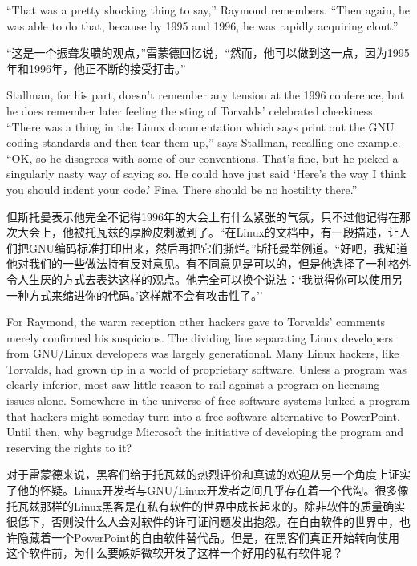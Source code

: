 \ifdefined\eng
``That was a pretty shocking thing to say,'' Raymond remembers. ``Then again, he was able to do that, because by 1995 and 1996, he was rapidly acquiring clout.''
\fi

\ifdefined\chs
``这是一个振聋发聩的观点，''雷蒙德回忆说，``然而，他可以做到这一点，因为1995年和1996年，他正不断的接受打击。''
\fi

\ifdefined\eng
Stallman, for his part, doesn't remember any tension at the 1996 conference, but he does remember later feeling the sting of Torvalds' celebrated cheekiness. ``There was a thing in the Linux documentation which says print out the GNU coding standards and then tear them up,'' says Stallman, recalling one example. ``OK, so he disagrees with some of our conventions. That's fine, but he picked a singularly nasty way of saying so. He could have just said `Here's the way I think you should indent your code.' Fine. There should be no hostility there.''
\fi

\ifdefined\chs
但斯托曼表示他完全不记得1996年的大会上有什么紧张的气氛，只不过他记得在那次大会上，他被托瓦兹的厚脸皮刺激到了。``在Linux的文档中，有一段描述，让人们把GNU编码标准打印出来，然后再把它们撕烂。''斯托曼举例道。``好吧，我知道他对我们的一些做法持有反对意见。有不同意见是可以的，但是他选择了一种格外令人生厌的方式去表达这样的观点。他完全可以换个说法：`我觉得你可以使用另一种方式来缩进你的代码。'这样就不会有攻击性了。''
\fi

\ifdefined\eng
For Raymond, the warm reception other hackers gave to Torvalds' comments merely confirmed his suspicions. The dividing line separating Linux developers from GNU/Linux developers was largely generational. Many Linux hackers, like Torvalds, had grown up in a world of proprietary software. Unless a program was clearly inferior, most saw little reason to rail against a program on licensing issues alone. Somewhere in the universe of free software systems lurked a program that hackers might someday turn into a free software alternative to PowerPoint. Until then, why begrudge Microsoft the initiative of developing the program and reserving the rights to it?
\fi

\ifdefined\chs
对于雷蒙德来说，黑客们给于托瓦兹的热烈评价和真诚的欢迎从另一个角度上证实了他的怀疑。Linux开发者与GNU/Linux开发者之间几乎存在着一个代沟。很多像托瓦兹那样的Linux黑客是在私有软件的世界中成长起来的。除非软件的质量确实很低下，否则没什么人会对软件的许可证问题发出抱怨。在自由软件的世界中，也许隐藏着一个PowerPoint的自由软件替代品。但是，在黑客们真正开始转向使用这个软件前，为什么要嫉妒微软开发了这样一个好用的私有软件呢？
\fi

